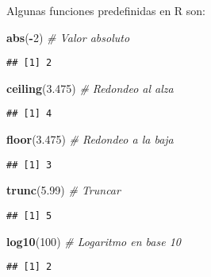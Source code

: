 \documentclass[
]{book}
\newenvironment{Shaded}{\begin{snugshade}}{\end{snugshade}}
\newcommand{\CommentTok}[1]{\textcolor[rgb]{0.56,0.35,0.01}{\textit{#1}}}
\newcommand{\DecValTok}[1]{\textcolor[rgb]{0.00,0.00,0.81}{#1}}
\newcommand{\FloatTok}[1]{\textcolor[rgb]{0.00,0.00,0.81}{#1}}
\newcommand{\KeywordTok}[1]{\textcolor[rgb]{0.13,0.29,0.53}{\textbf{#1}}}
\newcommand{\NormalTok}[1]{#1}
\newcommand{\OperatorTok}[1]{\textcolor[rgb]{0.81,0.36,0.00}{\textbf{#1}}}
\begin{document}
Algunas funciones predefinidas en R son:

\begin{Shaded}
\begin{Highlighting}[]
\KeywordTok{abs}\NormalTok{(}\OperatorTok{-}\DecValTok{2}\NormalTok{) }\CommentTok{# Valor absoluto}
\end{Highlighting}
\end{Shaded}

\begin{verbatim}
## [1] 2
\end{verbatim}

\begin{Shaded}
\begin{Highlighting}[]
\KeywordTok{ceiling}\NormalTok{(}\FloatTok{3.475}\NormalTok{) }\CommentTok{# Redondeo al alza}
\end{Highlighting}
\end{Shaded}

\begin{verbatim}
## [1] 4
\end{verbatim}

\begin{Shaded}
\begin{Highlighting}[]
\KeywordTok{floor}\NormalTok{(}\FloatTok{3.475}\NormalTok{) }\CommentTok{# Redondeo a la baja}
\end{Highlighting}
\end{Shaded}

\begin{verbatim}
## [1] 3
\end{verbatim}

\begin{Shaded}
\begin{Highlighting}[]
\KeywordTok{trunc}\NormalTok{(}\FloatTok{5.99}\NormalTok{) }\CommentTok{# Truncar}
\end{Highlighting}
\end{Shaded}

\begin{verbatim}
## [1] 5
\end{verbatim}

\begin{Shaded}
\begin{Highlighting}[]
\KeywordTok{log10}\NormalTok{(}\DecValTok{100}\NormalTok{) }\CommentTok{# Logaritmo en base 10}
\end{Highlighting}
\end{Shaded}

\begin{verbatim}
## [1] 2
\end{verbatim}
\end{document}
